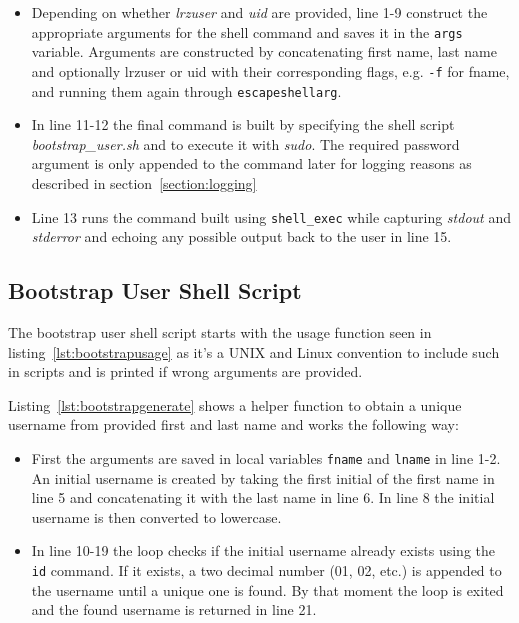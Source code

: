 \begin{itemize}
    \item Depending on whether \textit{lrzuser} and \textit{uid} are provided,
    line 1-9 construct the appropriate arguments for the shell command and saves
    it in the \texttt{args} variable. Arguments are constructed by concatenating
    first name, last name and optionally lrzuser or uid with their corresponding
    flags, e.g. \texttt{-f} for fname, and running them again through
    \texttt{escapeshellarg}.
    \item In line 11-12 the final command is built by specifying the shell
    script \textit{bootstrap\_user.sh} and to execute it with \textit{sudo}. The
    required password argument is only appended to the command later for logging
    reasons as described in section~\ref{section:logging}
    \item Line 13 runs the command built using \texttt{shell\_exec} while
    capturing \textit{stdout} and \textit{stderror} and echoing any possible
    output back to the user in line 15.
\end{itemize}

\subsection{Bootstrap User Shell Script}

The bootstrap user shell script starts with the usage function seen in
listing~\ref{lst:bootstrapusage} as it's a UNIX and Linux convention to include
such in scripts and is printed if wrong arguments are provided.





Listing~\ref{lst:bootstrapgenerate} shows a helper function to obtain a unique
username from provided first and last name and works the following way:

\begin{itemize}
    \item First the arguments are saved in local variables \texttt{fname} and
    \texttt{lname} in line 1-2. An initial username is created by taking the
    first initial of the first name in line 5 and concatenating it with the last
    name in line 6. In line 8 the initial username is then converted to
    lowercase.
    \item In line 10-19 the loop checks if the initial username already exists
    using the \texttt{id} command. If it exists, a two decimal number (01, 02,
    etc.) is appended to the username until a unique one is found. By that
    moment the loop is exited and the found username is returned in line 21.
\end{itemize}

